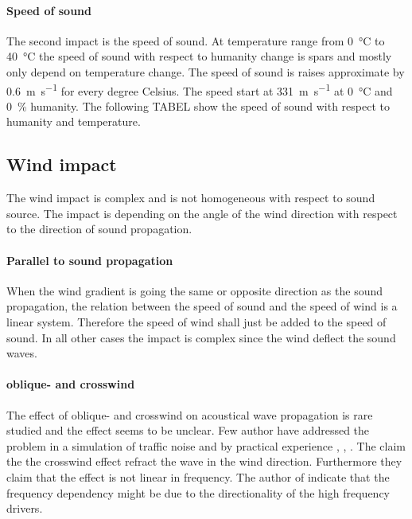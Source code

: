 \paragraph{Speed of sound} The second impact is the speed of sound. At temperature range from \SI{0}{\celsius} to \SI{40}{\celsius} the speed of sound with respect to humanity change is spars and mostly only depend on temperature change. The speed of sound is raises approximate by \SI{0.6}{\meter\per\second} for every degree Celsius. The speed start at \SI{331}{\meter\per\second} at \SI{0}{\celsius} and \SI{0}{\percent} humanity. The following TABEL show the speed of sound with respect to humanity and temperature. 


\subsection{Wind impact}

The wind impact is complex and is not homogeneous with respect to sound source. The impact is depending on the angle of the wind direction with respect to the direction of sound propagation. 


\paragraph{Parallel to sound propagation} When the wind gradient is going the same or opposite direction as the sound propagation, the relation between the speed of sound and the speed of wind is a linear system. Therefore the speed of wind shall just be added to the speed of sound. In all other cases the impact is complex since the wind deflect the sound waves.


\paragraph{oblique- and crosswind} The effect of oblique- and crosswind on acoustical wave propagation is rare studied and the effect seems to be unclear. Few author have addressed the problem in a simulation of traffic noise and by practical experience \citep{effect_of_wind}, \citep{crosswind_effect_2016}, \citep{BALLOU2008xi}. The claim the the crosswind effect refract the wave in the wind direction. Furthermore they claim that the effect is not linear in frequency. The author of \citep{BALLOU2008xi} indicate that the frequency dependency might be due to the directionality of the high frequency drivers. 



